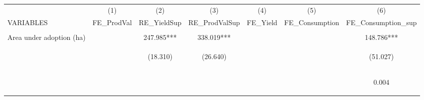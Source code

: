 \begin{center}
\begin{tabular}{lcccccc} \hline
 & (1) & (2) & (3) & (4) & (5) & (6) \\
VARIABLES & FE\_ProdVal & RE\_YieldSup & RE\_ProdValSup & FE\_Yield & FE\_Consumption & FE\_Consumption\_sup \\ \hline
\vspace{4pt} & \begin{footnotesize}\end{footnotesize} & \begin{footnotesize}\end{footnotesize} & \begin{footnotesize}\end{footnotesize} & \begin{footnotesize}\end{footnotesize} & \begin{footnotesize}\end{footnotesize} & \begin{footnotesize}\end{footnotesize} \\
Area under adoption (ha) &  & 247.985*** & 338.019*** &  &  & 148.786*** \\
 & \begin{footnotesize}\end{footnotesize} & \begin{footnotesize}(18.310)\end{footnotesize} & \begin{footnotesize}(26.640)\end{footnotesize} & \begin{footnotesize}\end{footnotesize} & \begin{footnotesize}\end{footnotesize} & \begin{footnotesize}(51.027)\end{footnotesize} \\
\vspace{4pt} & \begin{footnotesize}\end{footnotesize} & \begin{footnotesize}[0.000]\end{footnotesize} & \begin{footnotesize}[0.000]\end{footnotesize} & \begin{footnotesize}\end{footnotesize} & \begin{footnotesize}\end{footnotesize} & \begin{footnotesize}0.004\end{footnotesize} \\

\end{tabular}
\end{center}
